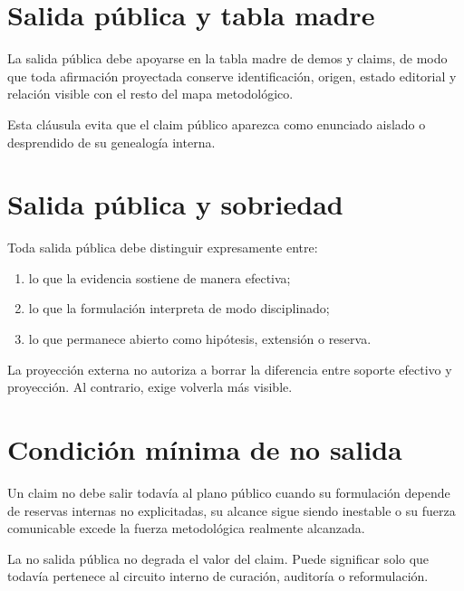 \section{Salida pública y tabla madre}
\begin{definition}
La salida pública debe apoyarse en la tabla madre de demos y claims, de modo que toda afirmación proyectada conserve identificación, origen, estado editorial y relación visible con el resto del mapa metodológico.
\end{definition}

\begin{observation}
Esta cláusula evita que el claim público aparezca como enunciado aislado o desprendido de su genealogía interna.
\end{observation}

\section{Salida pública y sobriedad}
\begin{definition}
Toda salida pública debe distinguir expresamente entre:
\begin{enumerate}
  \item lo que la evidencia sostiene de manera efectiva;
  \item lo que la formulación interpreta de modo disciplinado;
  \item lo que permanece abierto como hipótesis, extensión o reserva.
\end{enumerate}
\end{definition}

\begin{observation}
La proyección externa no autoriza a borrar la diferencia entre soporte efectivo y proyección. Al contrario, exige volverla más visible.
\end{observation}

\section{Condición mínima de no salida}
\begin{definition}
Un claim no debe salir todavía al plano público cuando su formulación depende de reservas internas no explicitadas, su alcance sigue siendo inestable o su fuerza comunicable excede la fuerza metodológica realmente alcanzada.
\end{definition}

\begin{observation}
La no salida pública no degrada el valor del claim. Puede significar solo que todavía pertenece al circuito interno de curación, auditoría o reformulación.
\end{observation}


